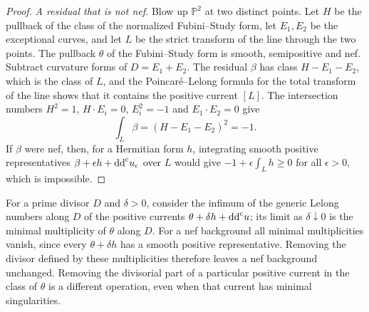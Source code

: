 \begin{proof}
\emph{A residual that is not nef.} Blow up $\mathbb P^2$ at two distinct points. Let $H$ be the pullback of the class of the normalized Fubini--Study form, let $E_1,E_2$ be the exceptional curves, and let $L$ be the strict transform of the line through the two points. The pullback $\theta$ of the Fubini--Study form is smooth, semipositive and nef. Subtract curvature forms of $D=E_1+E_2$. The residual $\beta$ has class $H-E_1-E_2$, which is the class of $L$, and the Poincar\'e--Lelong formula for the total transform of the line shows that it contains the positive current $[L]$. The intersection numbers $H^2=1$, $H\cdot E_i=0$, $E_i^2=-1$ and $E_1\cdot E_2=0$ give
\[
 \int_L\beta=(H-E_1-E_2)^2=-1.
\]
If $\beta$ were nef, then, for a Hermitian form $h$, integrating smooth positive representatives $\beta+\epsilon h+\mathrm{dd}^{\mathrm{c}} u_\epsilon$ over $L$ would give $-1+\epsilon\int_Lh\geq0$ for all $\epsilon>0$, which is impossible.
\end{proof}

For a prime divisor $D$ and $\delta>0$, consider the infimum of the generic Lelong numbers along $D$ of the positive currents $\theta+\delta h+\mathrm{dd}^{\mathrm{c}} u$; its limit as $\delta\downarrow0$ is the minimal multiplicity of $\theta$ along $D$. For a nef background all minimal multiplicities vanish, since every $\theta+\delta h$ has a smooth positive representative. Removing the divisor defined by these multiplicities therefore leaves a nef background unchanged. Removing the divisorial part of a particular positive current in the class of $\theta$ is a different operation, even when that current has minimal singularities.

